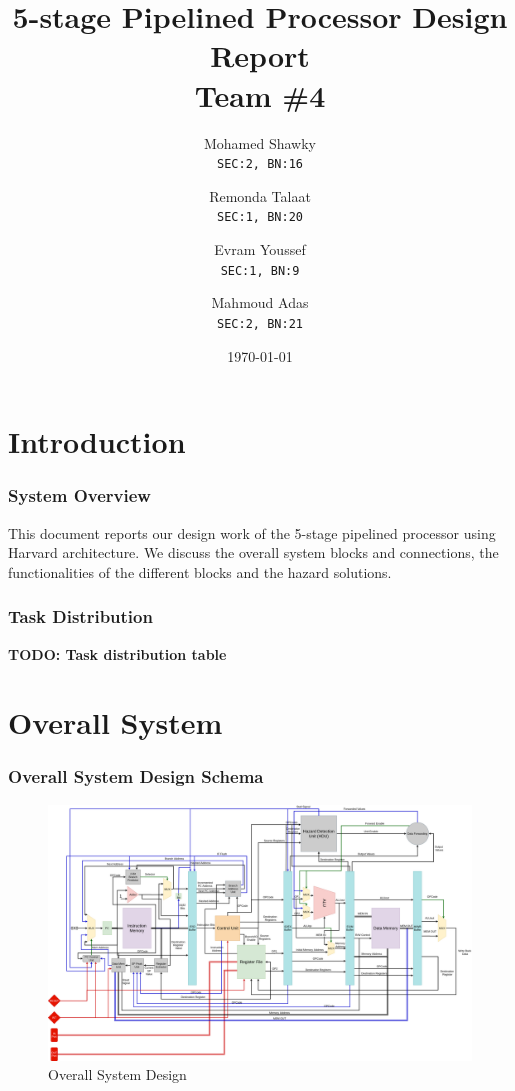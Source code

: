 \documentclass[12pt]{report}
\title{\textbf{5-stage Pipelined Processor Design Report}\\Team \#4}
\author{
  Mohamed Shawky\\
  \small\texttt{SEC:2, BN:16}
  \and
  Remonda Talaat\\
  \small\texttt{SEC:1, BN:20}
  \and
  Evram Youssef\\
  \small\texttt{SEC:1, BN:9}
  \and
  Mahmoud Adas\\
  \small\texttt{SEC:2, BN:21}
}
\date{\today}
\begin{document}
\thispagestyle{empty}

\maketitle
\tableofcontents
\listoffigures
\listoftables
\clearpage


\part{Introduction}

\section{System Overview}
This document reports our design work of the 5-stage pipelined processor using Harvard
architecture. We discuss the overall system blocks and connections, the functionalities of the
different blocks and the hazard solutions. 

\section{Task Distribution}
\textbf{TODO: Task distribution table}

\part{Overall System}

\section{Overall System Design Schema}
\begin{center}
    \begin{figure}[hp]
        \centering
        \includegraphics[width=\textwidth]{overall_system}
        \caption{Overall System Design}
        \label{fig:overall}
    \end{figure}
\end{center}
\end{document}
